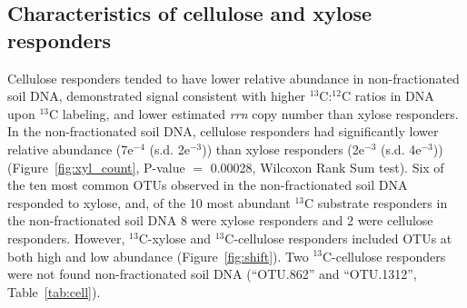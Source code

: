 \subsection{Characteristics of cellulose and xylose responders}
Cellulose responders tended to have lower relative abundance in
non-fractionated soil DNA, demonstrated signal consistent with higher
$^{13}$C:$^{12}$C ratios in DNA upon $^{13}$C labeling, and lower estimated
\textit{rrn} copy number than xylose responders. In the non-fractionated soil
DNA, cellulose responders had significantly lower relative abundance (7e$^{-4}$
(s.d. 2e$^{-3}$)) than xylose responders (2e$^{-3}$ (s.d. 4e$^{-3}$))
(Figure~\ref{fig:xyl_count}, P-value $=$ 0.00028, Wilcoxon Rank Sum test). Six
of the ten most common OTUs observed in the non-fractionated soil DNA responded
to xylose, and, of the 10 most abundant $^{13}$C substrate responders in the
non-fractionated soil DNA 8 were xylose responders and 2 were cellulose
responders. However, $^{13}$C-xylose and $^{13}$C-cellulose responders included
OTUs at both high and low abundance (Figure~\ref{fig:shift}). Two
$^{13}$C-cellulose responders were not found non-fractionated soil DNA
(``OTU.862'' and ``OTU.1312'', Table~\ref{tab:cell}).

